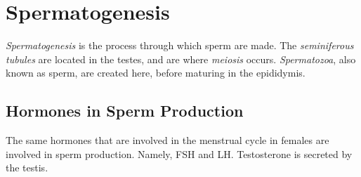 \documentclass[11pt,twoside]{article}
\begin{document}
	\section{Spermatogenesis}
		\emph{Spermatogenesis} is the process through which sperm are made. The \emph{seminiferous tubules} are located in the testes, and are where \emph{meiosis} occurs. \emph{Spermatozoa}, also known as sperm, are created here, before maturing in the epididymis.
		
		\subsection{Hormones in Sperm Production}
			The same hormones that are involved in the menstrual cycle in females are involved in sperm production. Namely, FSH and LH. Testosterone is secreted by the testis.
\end{document}
